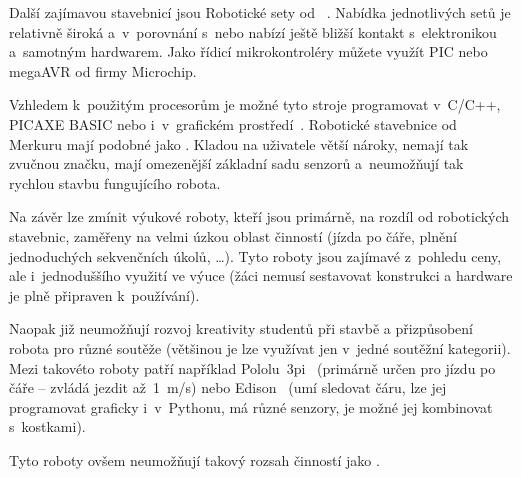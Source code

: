 
Další zajímavou stavebnicí jsou Robotické sety od ~\cite{merkur_roboticsSetsEshop}. 
Nabídka jednotlivých setů je relativně široká a~v~porovnání s~\legoM{ }nebo \fischerT{ }nabízí ještě bližší kontakt s~elektronikou a~samotným hardwarem. 
Jako řídicí mikrokontroléry můžete využít PIC nebo megaAVR od firmy Microchip. 

Vzhledem k~použitým procesorům je možné tyto stroje programovat v~C/C++, PICAXE BASIC nebo i~v~grafickém prostředí~\cite{picaxeCz_BlocklyForPICAXE}. 
Robotické stavebnice od Merkuru mají podobné  jako \fischerT. 
Kladou na uživatele větší nároky, nemají tak zvučnou značku, mají omezenější základní sadu senzorů a~neumožňují tak rychlou stavbu fungujícího robota.

Na závěr lze zmínit výukové roboty, kteří jsou primárně, na rozdíl od robotických stavebnic, zaměřeny na velmi úzkou oblast činností (jízda po čáře, plnění jednoduchých sekvenčních úkolů, \dots). 
Tyto roboty jsou zajímavé z~pohledu ceny, ale i~jednoduššího využití ve výuce (žáci nemusí sestavovat konstrukci a hardware je plně připraven k~používání). 

Naopak již neumožňují rozvoj kreativity studentů při stavbě a přizpůsobení robota pro různé soutěže (většinou je lze využívat jen v~jedné soutěžní kategorii).  
Mezi takovéto roboty patří například Pololu~3pi~\cite{robotPololu3pi} (primárně určen pro jízdu po čáře -- zvládá jezdit až~1~m/s) nebo Edison~\cite{robotEdison} (umí sledovat čáru, lze jej programovat graficky i~v~Pythonu, má různé senzory, je možné jej kombinovat s~\lego{ }kostkami). 

Tyto roboty ovšem neumožňují takový rozsah činností jako \legoM.

